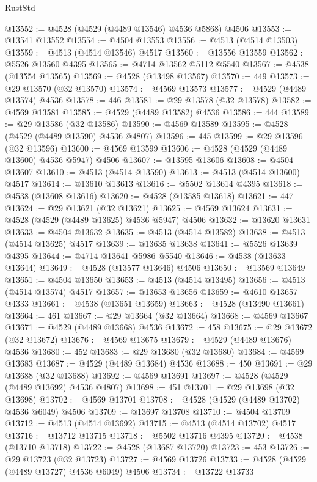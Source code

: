 \begin{lexlean}{RustStd}
\begin{coremodule}
@13552 := @4528 (@4529 (@4489 @13546) @4536 @5868) @4506
@13553 := @13541 @13552
@13554 := @4504 @13553
@13556 := @4513 (@4514 @13503)
@13559 := @4513 (@4514 @13546) @4517
@13560 := @13556 @13559
@13562 := @5526 @13560 @4395
@13565 := @4714 @13562 @5112 @5540
@13567 := @4538 (@13554 @13565)
@13569 := @4528 (@13498 @13567)
@13570 := 449
@13573 := @29 @13570 (@32 @13570)
@13574 := @4569 @13573
@13577 := @4529 (@4489 @13574) @4536
@13578 := 446
@13581 := @29 @13578 (@32 @13578)
@13582 := @4569 @13581
@13585 := @4529 (@4489 @13582) @4536
@13586 := 444
@13589 := @29 @13586 (@32 @13586)
@13590 := @4569 @13589
@13595 := @4528 (@4529 (@4489 @13590) @4536 @4807)
@13596 := 445
@13599 := @29 @13596 (@32 @13596)
@13600 := @4569 @13599
@13606 := @4528 (@4529 (@4489 @13600) @4536 @5947) @4506
@13607 := @13595 @13606
@13608 := @4504 @13607
@13610 := @4513 (@4514 @13590)
@13613 := @4513 (@4514 @13600) @4517
@13614 := @13610 @13613
@13616 := @5502 @13614 @4395
@13618 := @4538 (@13608 @13616)
@13620 := @4528 (@13585 @13618)
@13621 := 447
@13624 := @29 @13621 (@32 @13621)
@13625 := @4569 @13624
@13631 := @4528 (@4529 (@4489 @13625) @4536 @5947) @4506
@13632 := @13620 @13631
@13633 := @4504 @13632
@13635 := @4513 (@4514 @13582)
@13638 := @4513 (@4514 @13625) @4517
@13639 := @13635 @13638
@13641 := @5526 @13639 @4395
@13644 := @4714 @13641 @5986 @5540
@13646 := @4538 (@13633 @13644)
@13649 := @4528 (@13577 @13646) @4506
@13650 := @13569 @13649
@13651 := @4504 @13650
@13653 := @4513 (@4514 @13495)
@13656 := @4513 (@4514 @13574) @4517
@13657 := @13653 @13656
@13659 := @4610 @13657 @4333
@13661 := @4538 (@13651 @13659)
@13663 := @4528 (@13490 @13661)
@13664 := 461
@13667 := @29 @13664 (@32 @13664)
@13668 := @4569 @13667
@13671 := @4529 (@4489 @13668) @4536
@13672 := 458
@13675 := @29 @13672 (@32 @13672)
@13676 := @4569 @13675
@13679 := @4529 (@4489 @13676) @4536
@13680 := 452
@13683 := @29 @13680 (@32 @13680)
@13684 := @4569 @13683
@13687 := @4529 (@4489 @13684) @4536
@13688 := 450
@13691 := @29 @13688 (@32 @13688)
@13692 := @4569 @13691
@13697 := @4528 (@4529 (@4489 @13692) @4536 @4807)
@13698 := 451
@13701 := @29 @13698 (@32 @13698)
@13702 := @4569 @13701
@13708 := @4528 (@4529 (@4489 @13702) @4536 @6049) @4506
@13709 := @13697 @13708
@13710 := @4504 @13709
@13712 := @4513 (@4514 @13692)
@13715 := @4513 (@4514 @13702) @4517
@13716 := @13712 @13715
@13718 := @5502 @13716 @4395
@13720 := @4538 (@13710 @13718)
@13722 := @4528 (@13687 @13720)
@13723 := 453
@13726 := @29 @13723 (@32 @13723)
@13727 := @4569 @13726
@13733 := @4528 (@4529 (@4489 @13727) @4536 @6049) @4506
@13734 := @13722 @13733

\end{coremodule}
\end{lexlean}
